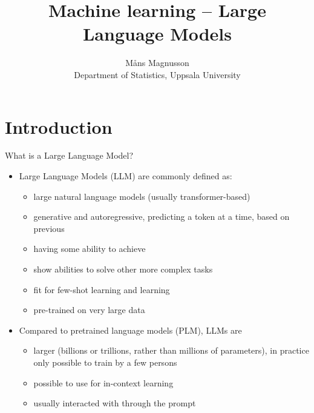 \documentclass[10pt]{beamer}
\title[]{{\color{black}Machine learning -- Large Language Models}}
\author[]{M{\aa}ns Magnusson\\Department of Statistics, Uppsala University}
\date{\currentsemester}
\begin{document}
\frame{\titlepage
}





\section{Introduction} %

\begin{frame}{What is a Large Language Model?}

\begin{itemize}
  \item Large Language Models (LLM) are commonly defined as:
  \begin{itemize}
      \item large natural language models (usually transformer-based)
      \pause
      \item generative and autoregressive, predicting a token at a time, based on previous 
      \pause
      \item having some ability to achieve 
      \item show  abilities to solve other more complex tasks
      \pause
      \item fit for few-shot learning and  learning
      \pause
      \item pre-trained on very large data
  \end{itemize}
  \item Compared to pretrained language models (PLM), LLMs are
  \begin{itemize}
      \item larger (billions or trillions, rather than millions of parameters), in practice only possible to train by a few persons
      \item possible to use for in-context learning
      \item usually interacted with through the prompt
  \end{itemize}
\end{itemize}

\end{frame}
\end{document}

